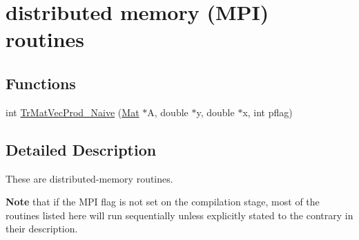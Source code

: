 \hypertarget{group__matmap__group12b}{\section{distributed memory (M\-P\-I) routines}
\label{group__matmap__group12b}
}
\subsection*{Functions}
\begin{DoxyCompactItemize}
\item 
int \hyperlink{group__matmap__group12b_ga46ad4af50377be15a0aa50f416a53ade}{Tr\-Mat\-Vec\-Prod\-\_\-\-Naive} (\hyperlink{structMat}{Mat} $\ast$A, double $\ast$y, double $\ast$x, int pflag)
\end{DoxyCompactItemize}


\subsection{Detailed Description}
These are distributed-\/memory routines.

{\bfseries Note} that if the M\-P\-I flag is not set on the compilation stage, most of the routines listed here will run sequentially unless explicitly stated to the contrary in their description. 

